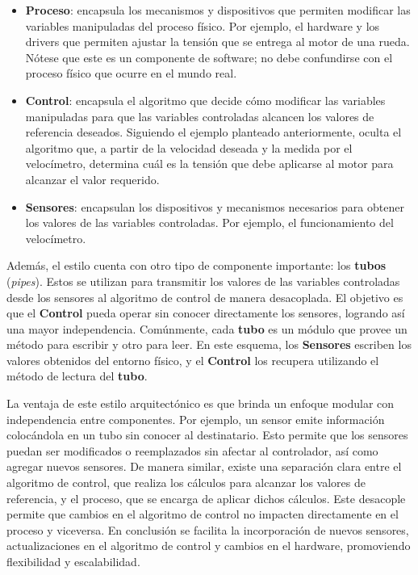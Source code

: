 \begin{itemize}
\item \textbf{Proceso}: encapsula los mecanismos y dispositivos que permiten modificar las variables manipuladas del proceso físico. Por ejemplo, el hardware y los drivers que permiten ajustar la tensión que se entrega al motor de una rueda. Nótese que este es un componente de software; no debe confundirse con el proceso físico que ocurre en el mundo real.

\item \textbf{Control}: encapsula el algoritmo que decide cómo modificar las variables manipuladas para que las variables controladas alcancen los valores de referencia deseados. Siguiendo el ejemplo planteado anteriormente, oculta el algoritmo que, a partir de la velocidad deseada y la medida por el velocímetro, determina cuál es la tensión que debe aplicarse al motor para alcanzar el valor requerido.

\item \textbf{Sensores}: encapsulan los dispositivos y mecanismos necesarios para obtener los valores de las variables controladas. Por ejemplo, el funcionamiento del velocímetro.
\end{itemize}

Además, el estilo cuenta con otro tipo de componente importante: los \textbf{tubos} (\textit{pipes}). Estos se utilizan para transmitir los valores de las variables controladas desde los sensores al algoritmo de control de manera desacoplada. El objetivo es que el \textbf{Control} pueda operar sin conocer directamente los sensores, logrando así una mayor independencia. Comúnmente, cada \textbf{tubo} es un módulo que provee un método para escribir y otro para leer. En este esquema, los \textbf{Sensores} escriben los valores obtenidos del entorno físico, y el \textbf{Control} los recupera utilizando el método de lectura del \textbf{tubo}.


La ventaja de este estilo arquitectónico es que brinda un enfoque modular con independencia entre componentes. Por ejemplo, un sensor emite información colocándola en un tubo sin conocer al destinatario. Esto permite que los sensores puedan ser modificados o reemplazados sin afectar al controlador, así como agregar nuevos sensores. De manera similar, existe una separación clara entre el algoritmo de control, que realiza los cálculos para alcanzar los valores de referencia, y el proceso, que se encarga de aplicar dichos cálculos. Este desacople permite que cambios en el algoritmo de control no impacten directamente en el proceso y viceversa. En conclusión se facilita la incorporación de nuevos sensores, actualizaciones en el algoritmo de control y cambios en el hardware, promoviendo flexibilidad y escalabilidad.



